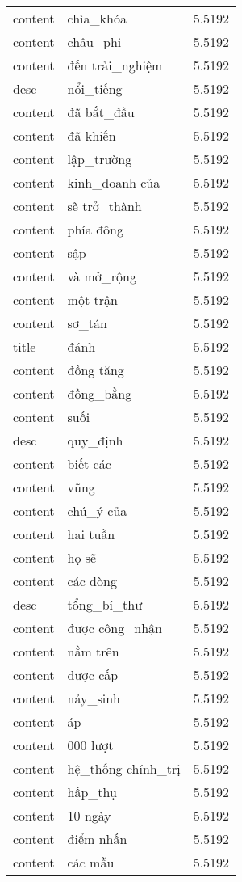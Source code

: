 \documentclass{article}
\begin{document}
\begin{tabular}{lll}
content & chìa\_khóa & 5.5192\\
content & châu\_phi & 5.5192\\
content & đến trải\_nghiệm & 5.5192\\
desc & nổi\_tiếng & 5.5192\\
content & đã bắt\_đầu & 5.5192\\
content & đã khiến & 5.5192\\
content & lập\_trường & 5.5192\\
content & kinh\_doanh của & 5.5192\\
content & sẽ trở\_thành & 5.5192\\
content & phía đông & 5.5192\\
content & sập & 5.5192\\
content & và mở\_rộng & 5.5192\\
content & một trận & 5.5192\\
content & sơ\_tán & 5.5192\\
title & đánh & 5.5192\\
content & đồng tăng & 5.5192\\
content & đồng\_bằng & 5.5192\\
content & suối & 5.5192\\
desc & quy\_định & 5.5192\\
content & biết các & 5.5192\\
content & vũng & 5.5192\\
content & chú\_ý của & 5.5192\\
content & hai tuần & 5.5192\\
content & họ sẽ & 5.5192\\
content & các dòng & 5.5192\\
desc & tổng\_bí\_thư & 5.5192\\
content & được công\_nhận & 5.5192\\
content & nằm trên & 5.5192\\
content & được cấp & 5.5192\\
content & nảy\_sinh & 5.5192\\
content & áp & 5.5192\\
content & 000 lượt & 5.5192\\
content & hệ\_thống chính\_trị & 5.5192\\
content & hấp\_thụ & 5.5192\\
content & 10 ngày & 5.5192\\
content & điểm nhấn & 5.5192\\
content & các mẫu & 5.5192\\

\end{tabular}
\end{document}
